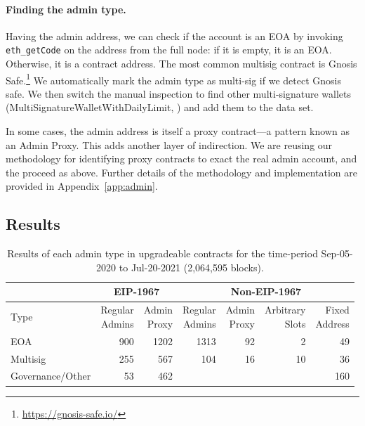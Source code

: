 \paragraph{Finding the admin type.} Having the admin address, we can check if the account is an EOA by invoking \texttt{eth\_getCode} on the address from the full node: if it is empty, it is an EOA. Otherwise, it is a contract address. The most common multisig contract is Gnosis Safe.\footnote{\url{https://gnosis-safe.io/}} We automatically mark the admin type as multi-sig if we detect Gnosis safe. We then switch the manual inspection to find other multi-signature wallets (\eg MultiSignatureWalletWithDailyLimit, \etc) and add them to the data set. 

In some cases, the admin address is itself a proxy contract---a pattern known as an Admin Proxy. This adds another layer of indirection. We are reusing our methodology for identifying proxy contracts to exact the real admin account, and the proceed as above. Further details of the methodology and implementation are provided in Appendix~\ref{app:admin}.

\subsection{Results}

\begin{table}[t]
\centering
\begin{tabular}{|l|r|r|r|r|r|r|}
\hline      &\multicolumn{2}{c|}{EIP-1967} & \multicolumn{4}{c|}{Non-EIP-1967}         \\
\hline
Type 				& \makecell{Regular\\Admins} & \makecell{Admin\\Proxy} 	& \makecell{Regular\\Admins} 	& \makecell{Admin\\Proxy} & \makecell{Arbitrary\\Slots} &  \makecell{Fixed\\Address}  \\ \hline 
EOA 				& 900  	& 1202		& 1313		& 92			& 2		& 49 		\\ 
Multisig 			& 255  	& 567		& 104		& 16			& 10		& 36		\\ 
Governance/Other 	& 53  	& 462		& 			& 			& 		& 160 	\\ \hline
\end{tabular}
\caption{\label{tab:admindata} Results of each admin type in upgradeable contracts for the time-period {Sep-05-2020} to {Jul-20-2021} (2,064,595 blocks).}
\vspace{-10pt}
\end{table}

